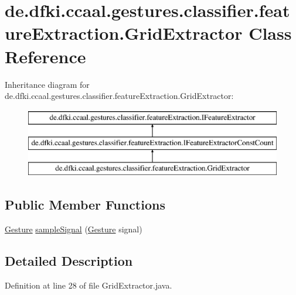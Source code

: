 \hypertarget{classde_1_1dfki_1_1ccaal_1_1gestures_1_1classifier_1_1feature_extraction_1_1_grid_extractor}{\section{de.\-dfki.\-ccaal.\-gestures.\-classifier.\-feature\-Extraction.\-Grid\-Extractor Class Reference}
\label{classde_1_1dfki_1_1ccaal_1_1gestures_1_1classifier_1_1feature_extraction_1_1_grid_extractor}
}
Inheritance diagram for de.\-dfki.\-ccaal.\-gestures.\-classifier.\-feature\-Extraction.\-Grid\-Extractor\-:\begin{figure}[H]
\begin{center}
\leavevmode
\includegraphics[height=3.000000cm]{classde_1_1dfki_1_1ccaal_1_1gestures_1_1classifier_1_1feature_extraction_1_1_grid_extractor}
\end{center}
\end{figure}
\subsection*{Public Member Functions}
\begin{DoxyCompactItemize}
\item 
\hyperlink{classde_1_1dfki_1_1ccaal_1_1gestures_1_1_gesture}{Gesture} \hyperlink{classde_1_1dfki_1_1ccaal_1_1gestures_1_1classifier_1_1feature_extraction_1_1_grid_extractor_a9ca6e9987725c4a40756863614849458}{sample\-Signal} (\hyperlink{classde_1_1dfki_1_1ccaal_1_1gestures_1_1_gesture}{Gesture} signal)
\end{DoxyCompactItemize}


\subsection{Detailed Description}


Definition at line 28 of file Grid\-Extractor.\-java.




